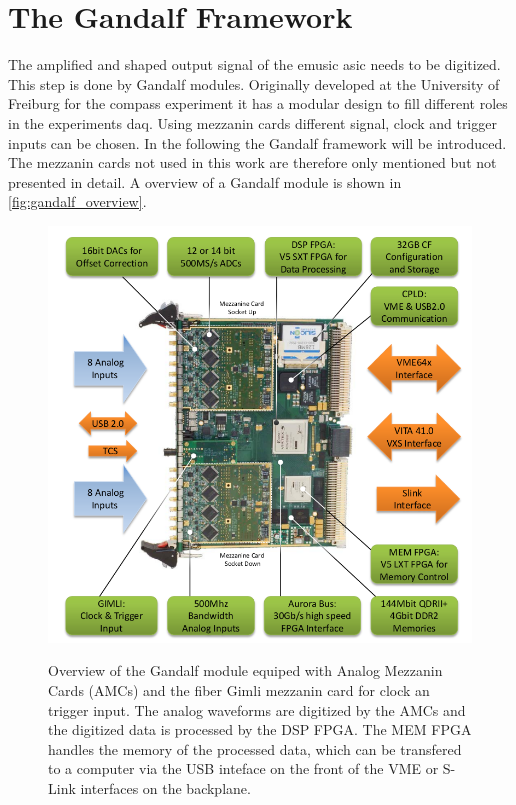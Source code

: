 \section{The Gandalf Framework}
The amplified and shaped output signal of the \ac{emusic} \ac{asic} needs to be digitized.
This step is done by Gandalf modules.
Originally developed at the University of Freiburg for the \ac{compass} experiment it has a modular design to fill different roles in the experiments \ac{daq}.
Using mezzanin cards different signal, clock and trigger inputs can be chosen.
In the following the Gandalf framework will be introduced.
The mezzanin cards not used in this work are therefore only mentioned but not presented in detail.
A overview of a Gandalf module is shown in \autoref{fig:gandalf_overview}.
\begin{figure}
	\centering
	\includegraphics[width=1.\linewidth]{pictures/gandalf_overview.png}
	\label{fig:gandalf_overview}
	\caption{Overview of the Gandalf module equiped with Analog Mezzanin Cards (AMCs) and the fiber Gimli mezzanin card for clock an trigger input. The analog waveforms are digitized by the AMCs and the digitized data is processed by the DSP FPGA. The MEM FPGA handles the memory of the processed data, which can be transfered to a computer via the USB inteface on the front of the VME or S-Link interfaces on the backplane. \cite{herrmann}}
\end{figure}

